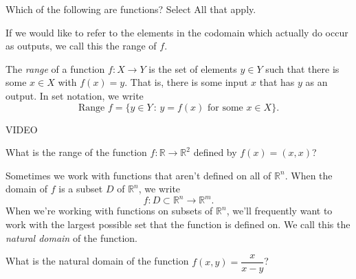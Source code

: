 \documentclass{ximera}
\begin{document}
\begin{problem}
Which of the following are functions? Select All that apply.
\begin{selectAll}
\end{selectAll}
\end{problem}

If we would like to refer to the elements in the codomain which actually do occur as outputs, we call this the range of $f$.

\begin{definition}
The \emph{range} of a function $f:X\rightarrow Y$ is the set of elements $y\in Y$ such that there is some $x\in X$ with $f(x) = y$. That is, there is some input $x$ that has $y$ as an output. In set notation, we write
\[
\textrm{Range }f = \{y\in Y\,:\, y = f(x) \textrm{ for some } x\in X\}.
\]
\end{definition}

VIDEO

\begin{problem}
What is the range of the function $f:\mathbb{R}\rightarrow \mathbb{R}^2$ defined by $f(x) = (x,x)$?
\begin{multipleChoice}
\end{multipleChoice}
\end{problem}

Sometimes we work with functions that aren't defined on all of $\mathbb{R}^n$. When the domain of $f$ is a subset $D$ of $\mathbb{R}^n$, we write
\[
f:D\subset\mathbb{R}^n\rightarrow\mathbb{R}^m.
\]
When we're working with functions on subsets of $\mathbb{R}^n$, we'll frequently want to work with the largest possible set that the function is defined on. We call this the \emph{natural domain} of the function.

\begin{problem}
What is the natural domain of the function $f(x,y) = \dfrac{x}{x-y}$?
\begin{multipleChoice}
\end{multipleChoice}
\end{problem}
\end{document}
